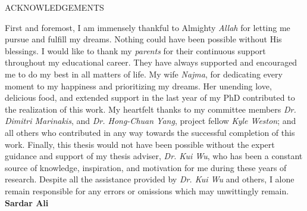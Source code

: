 \newpage
{}

\begin{center}
ACKNOWLEDGEMENTS
\end{center}\begin{flushright}
First and foremost, I am immensely thankful to Almighty \textit{Allah} for
letting me pursue and fulfill my dreams. Nothing could have been
possible without His blessings.
\newline
\newline
I would like to thank my \textit{parents} for their continuous support throughout my
educational career. They have always supported and encouraged me to do my best in all
matters of life.
\newline
\newline
My wife \textit{Najma}, for dedicating every moment to my happiness and prioritizing my dreams. Her unending love, delicious food, and
extended support in the last year of my PhD contributed to the realization of this work.
\newline
\newline
My heartfelt thanks to my committee members \textit{Dr. Dimitri Marinakis}, and \textit{Dr. Hong-Chuan Yang}, project fellow \textit{Kyle Weston}; and all
others who contributed in any way towards the successful completion of this work.
\newline
\newline
Finally, this thesis would not have been possible without the expert
guidance and support of my thesis adviser, \textit{Dr. Kui Wu}, who has been a constant
source of knowledge, inspiration, and motivation for me during these years of research. Despite
all the assistance provided by \textit{Dr. Kui Wu} and others, I alone
remain responsible for any errors or omissions which may unwittingly
remain.
\newline
\newline
\newline
\newline
\newline
\textbf{Sardar Ali} \end{flushright}